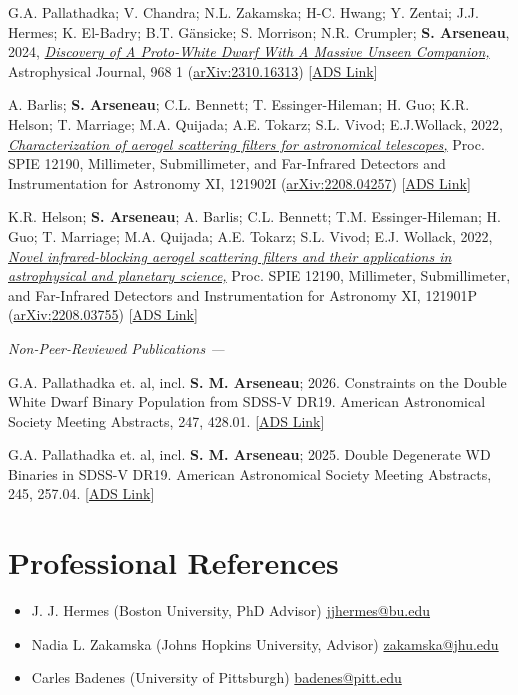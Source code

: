 \documentclass[11pt]{article}       %
\newcommand{\doi}[2]{\emph{\href{http://dx.doi.org/#1}{{#2}}}}
\newcommand{\arxiv}[1]{{\href{http://arxiv.org/abs/#1}{arXiv:{#1}}}}
\newcommand{\email}[1]{{\href{mailto:#1}{{#1}}}}
\begin{document}
\begin{etaremune}
    \item G.A. Pallathadka; V. Chandra; N.L. Zakamska; H-C. Hwang; Y. Zentai; J.J. Hermes; K. El-Badry; B.T. G\"ansicke; S. Morrison; N.R. Crumpler; \textbf{S. Arseneau}, 2024, \doi{10.3847/1538-4357/ad3e86}{Discovery of A Proto-White Dwarf With A Massive Unseen Companion,} Astrophysical Journal, 968 1 (\arxiv{2310.16313}) [\href{https://ui.adsabs.harvard.edu/abs/2024ApJ...968...42A}{ADS Link}]
  
    \item A. Barlis; \textbf{S. Arseneau}; C.L. Bennett; T. Essinger-Hileman; H. Guo; K.R. Helson; T. Marriage; M.A. Quijada; A.E. Tokarz; S.L. Vivod; E.J.Wollack, 2022, \doi{10.1117/12.2627341}{Characterization of aerogel scattering filters for astronomical telescopes,} Proc. SPIE 12190, Millimeter, Submillimeter, and Far-Infrared Detectors and Instrumentation for Astronomy XI, 121902I (\arxiv{2208.04257}) [\href{https://ui.adsabs.harvard.edu/abs/2022SPIE12190E..2IB}{ADS Link}]
  
    \item K.R. Helson; \textbf{S. Arseneau}; A. Barlis; C.L. Bennett; T.M. Essinger-Hileman; H. Guo; T. Marriage; M.A. Quijada; A.E. Tokarz; S.L. Vivod; E.J. Wollack, 2022, \doi{10.1117/12.2630165}{Novel infrared-blocking aerogel scattering filters and their applications in astrophysical and planetary science,} Proc. SPIE 12190, Millimeter, Submillimeter, and Far-Infrared Detectors and Instrumentation for Astronomy XI, 121901P (\arxiv{2208.03755}) [\href{https://ui.adsabs.harvard.edu/abs/2022SPIE12190E..1PH}{ADS Link}]
\end{etaremune}

\textit{Non-Peer-Reviewed Publications ---}

\begin{etaremune}
    \item G.A. Pallathadka et. al, incl. \textbf{S. M. Arseneau}; 2026. Constraints on the Double White Dwarf Binary Population from SDSS-V DR19. American Astronomical Society Meeting Abstracts, 247, 428.01. [\href{https://ui.adsabs.harvard.edu/abs/2026AAS...24742801A/}{ADS Link}]
    
    \item G.A. Pallathadka et. al, incl. \textbf{S. M. Arseneau}; 2025. Double Degenerate WD Binaries in SDSS-V DR19. American Astronomical Society Meeting Abstracts, 245, 257.04. [\href{https://ui.adsabs.harvard.edu/abs/2025AAS...24525704A/}{ADS Link}]
\end{etaremune}

\section{Professional References}
\begin{itemize}
  \item J. J. Hermes (Boston University, PhD Advisor) \hfill \email{jjhermes@bu.edu}
  \item Nadia L. Zakamska (Johns Hopkins University, Advisor) \hfill \email{zakamska@jhu.edu}
  \item Carles Badenes (University of Pittsburgh) \hfill \email{badenes@pitt.edu}
\end{itemize}
\end{document}
